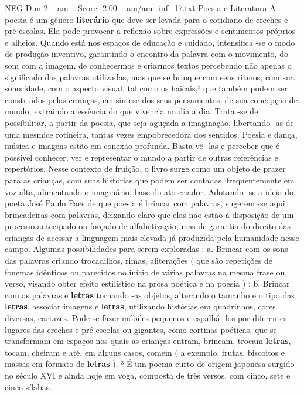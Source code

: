 \begin{textsample}{NEG Dim 2 – am – Score -2.00 – am/am\_inf\_17.txt}  \label{ex:f2_neg_135}
Poesia e Literatura A poesia é um gênero \textbf{literário} que deve ser levada para o cotidiano de creches e pré-escolas.
Ela pode provocar a reflexão sobre expressões e sentimentos próprios e alheios.
Quando está nos espaços de educação e cuidado, intensifica -se o modo de produção inventivo, garantindo o encontro da palavra com o movimento, do som com a imagem, de conhecermos e criarmos textos percebendo não apenas o significado das palavras utilizadas, mas que se brinque com seus ritmos, com sua sonoridade, com o aspecto visual, tal como os haicais,³ que também podem ser construídos pelas crianças, em síntese dos seus pensamentos, de sua concepção de mundo, extraindo a essência do que vivencia no dia a dia.
Trata -se de possibilitar, a partir da poesia, que seja aguçada a imaginação, libertando -as de uma mesmice rotineira, tantas vezes empobrecedora dos sentidos.
Poesia e dança, música e imagens estão em conexão profunda.
Basta vê -las e perceber que é possível conhecer, ver e representar o mundo a partir de outras referências e repertórios.
Nesse contexto de fruição, o livro surge como um objeto de prazer para as crianças, com suas histórias que podem ser contadas, frequentemente em voz alta, alimentando o imaginário, base do ato criador.
Adotando -se a ideia do poeta José Paulo Paes de que poesia é brincar com palavras, sugerem -se aqui brincadeiras com palavras, deixando claro que elas não estão à disposição de um processo antecipado ou forçado de alfabetização, mas de garantia do direito das crianças de acessar a linguagem mais elevada já produzida pela humanidade nesse campo.
Algumas possibilidades para serem exploradas : a.
Brincar com os sons das palavras criando trocadilhos, rimas, aliterações ( que são repetições de fonemas idênticos ou parecidos no início de várias palavras na mesma frase ou verso, visando obter efeito estilístico na prosa poética e na poesia ) ; b.
Brincar com as palavras e \textbf{letras} tornando -as objetos, alterando o tamanho e o tipo das \textbf{letras}, associar imagens e \textbf{letras}, utilizando histórias em quadrinhos, cores diversas, cartazes.
Pode se fazer móbiles pequenos e espalhá -los por diferentes lugares das creches e pré-escolas ou gigantes, como cortinas poéticas, que se transformam em espaços nos quais as crianças entram, brincam, trocam \textbf{letras}, tocam, cheiram e até, em alguns casos, comem ( a exemplo, frutas, biscoitos e massas em formato de \textbf{letras} ). ³ É um poema curto de origem japonesa surgido no século XVI e ainda hoje em voga, composta de três versos, com cinco, sete e cinco sílabas.

\end{textsample}
